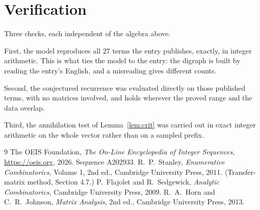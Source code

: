 \documentclass[11pt,a4paper]{article}
\theoremstyle{plain}
\theoremstyle{definition}
\begin{document}
\section{Verification}

Three checks, each independent of the algebra above.

First, the model reproduces all $27$ terms the entry publishes, exactly, in integer
arithmetic. This is what ties the model to the entry: the digraph is built by reading the
entry's English, and a misreading gives different counts.

Second, the conjectured recurrence was evaluated directly on those published terms, with no
matrices involved, and holds wherever the proved range and the data overlap.

Third, the annihilation test of Lemma~\ref{lem:crit} was carried out in exact integer
arithmetic on the whole vector rather than on a sampled prefix.

\begin{thebibliography}{9}
 The OEIS Foundation, \emph{The On-Line Encyclopedia of Integer
Sequences}, \url{https://oeis.org}, 2026. Sequence A202933.
 R.~P.~Stanley, \emph{Enumerative Combinatorics}, Volume 1, 2nd ed.,
Cambridge University Press, 2011. (Transfer-matrix method, Section 4.7.)
 P.~Flajolet and R.~Sedgewick, \emph{Analytic Combinatorics}, Cambridge
University Press, 2009.
 R.~A.~Horn and C.~R.~Johnson, \emph{Matrix Analysis}, 2nd ed., Cambridge
University Press, 2013.
\end{thebibliography}
\end{document}
